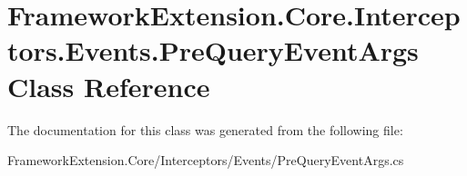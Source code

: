 \hypertarget{class_framework_extension_1_1_core_1_1_interceptors_1_1_events_1_1_pre_query_event_args}{\section{Framework\-Extension.\-Core.\-Interceptors.\-Events.\-Pre\-Query\-Event\-Args Class Reference}
\label{class_framework_extension_1_1_core_1_1_interceptors_1_1_events_1_1_pre_query_event_args}
}


The documentation for this class was generated from the following file\-:\begin{DoxyCompactItemize}
\item 
Framework\-Extension.\-Core/\-Interceptors/\-Events/Pre\-Query\-Event\-Args.\-cs\end{DoxyCompactItemize}
